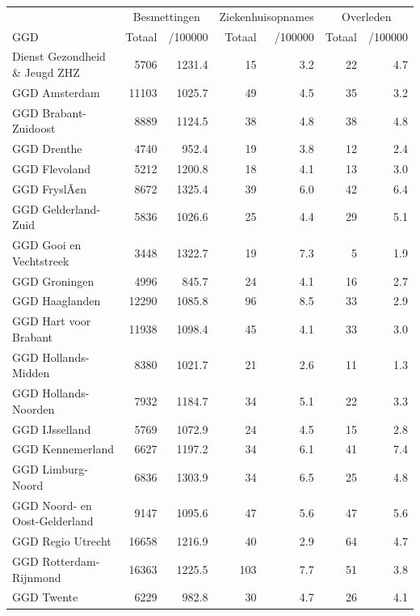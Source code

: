 \documentclass[
  english,
  man,floatsintext]{apa6}
\begin{document}
\begin{table}
\centering\begingroup\fontsize{10}{12}\selectfont

\begin{threeparttable}
\begin{tabular}{lrrrrrr}
\toprule
\multicolumn{1}{c}{ } & \multicolumn{2}{c}{Besmettingen} & \multicolumn{2}{c}{Ziekenhuisopnames} & \multicolumn{2}{c}{Overleden} \\
\cmidrule(l{3pt}r{3pt}){2-3} \cmidrule(l{3pt}r{3pt}){4-5} \cmidrule(l{3pt}r{3pt}){6-7}
GGD & Totaal & /100000 & Totaal & /100000 & Totaal & /100000\\
\midrule
Dienst Gezondheid \& Jeugd ZHZ & 5706 & 1231.4 & 15 & 3.2 & 22 & 4.7\\
GGD Amsterdam & 11103 & 1025.7 & 49 & 4.5 & 35 & 3.2\\
GGD Brabant-Zuidoost & 8889 & 1124.5 & 38 & 4.8 & 38 & 4.8\\
GGD Drenthe & 4740 & 952.4 & 19 & 3.8 & 12 & 2.4\\
GGD Flevoland & 5212 & 1200.8 & 18 & 4.1 & 13 & 3.0\\
GGD FryslÃ¢n & 8672 & 1325.4 & 39 & 6.0 & 42 & 6.4\\
GGD Gelderland-Zuid & 5836 & 1026.6 & 25 & 4.4 & 29 & 5.1\\
GGD Gooi en Vechtstreek & 3448 & 1322.7 & 19 & 7.3 & 5 & 1.9\\
GGD Groningen & 4996 & 845.7 & 24 & 4.1 & 16 & 2.7\\
GGD Haaglanden & 12290 & 1085.8 & 96 & 8.5 & 33 & 2.9\\
GGD Hart voor Brabant & 11938 & 1098.4 & 45 & 4.1 & 33 & 3.0\\
GGD Hollands-Midden & 8380 & 1021.7 & 21 & 2.6 & 11 & 1.3\\
GGD Hollands-Noorden & 7932 & 1184.7 & 34 & 5.1 & 22 & 3.3\\
GGD IJsselland & 5769 & 1072.9 & 24 & 4.5 & 15 & 2.8\\
GGD Kennemerland & 6627 & 1197.2 & 34 & 6.1 & 41 & 7.4\\
GGD Limburg-Noord & 6836 & 1303.9 & 34 & 6.5 & 25 & 4.8\\
GGD Noord- en Oost-Gelderland & 9147 & 1095.6 & 47 & 5.6 & 47 & 5.6\\
GGD Regio Utrecht & 16658 & 1216.9 & 40 & 2.9 & 64 & 4.7\\
GGD Rotterdam-Rijnmond & 16363 & 1225.5 & 103 & 7.7 & 51 & 3.8\\
GGD Twente & 6229 & 982.8 & 30 & 4.7 & 26 & 4.1\\

\end{tabular}
\end{threeparttable}
\end{table}
\end{document}
